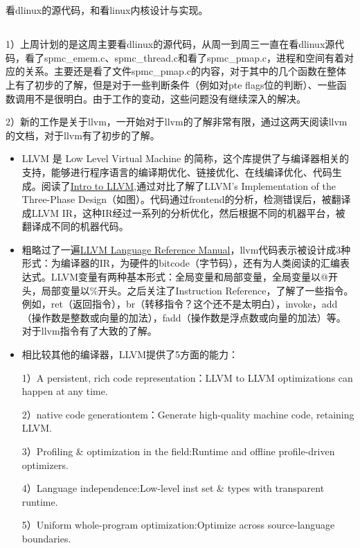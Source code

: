 \section{}

\subsection{}


看dlinux的源代码，和看linux内核设计与实现。

\subsection{}


1）上周计划的是这周主要看dlinux的源代码，从周一到周三一直在看dlinux源代码，看了spmc\_emem.c、spmc\_thread.c和看了spmc\_pmap.c，进程和空间有着对应的关系。主要还是看了文件spmc\_pmap.c的内容，对于其中的几个函数在整体上有了初步的了解，但是对于一些判断条件（例如对pte flags位的判断）、一些函数调用不是很明白。由于工作的变动，这些问题没有继续深入的解决。


2）新的工作是关于llvm，一开始对于llvm的了解非常有限，通过这两天阅读llvm的文档，对于llvm有了初步的了解。

\begin{itemize}

\item{LLVM 是 Low Level Virtual Machine 的简称，这个库提供了与编译器相关的支持，能够进行程序语言的编译期优化、链接优化、在线编译优化、代码生成。阅读了\href{http://www.aosabook.org/en/llvm.html}{Intro to LLVM},通过对比了解了LLVM's Implementation of the Three-Phase Design（如图）。代码通过frontend的分析，检测错误后，被翻译成LLVM IR，这种IR经过一系列的分析优化，然后根据不同的机器平台，被翻译成不同的机器代码。}

\item{粗略过了一遍\href{http://llvm.org/docs/LangRef.html}{LLVM Language Reference Manual}，llvm代码表示被设计成3种形式：为编译器的IR，为硬件的bitcode（字节码），还有为人类阅读的汇编表达式。LLVM变量有两种基本形式：全局变量和局部变量，全局变量以@开头，局部变量以\%开头。之后关注了Instruction Reference，了解了一些指令。例如，ret（返回指令），br（转移指令？这个还不是太明白），invoke，add（操作数是整数或向量的加法），fadd（操作数是浮点数或向量的加法）等。对于llvm指令有了大致的了解。}
\item{相比较其他的编译器，LLVM提供了5方面的能力：

1）A persistent, rich code representation：LLVM to LLVM optimizations can happen at any time.

2）native code generationtem：Generate high-quality machine code, retaining LLVM.

3）Profiling \& optimization in the field:Runtime and offline profile-driven optimizers.

4）Language independence:Low-level inst set \& types with transparent runtime.

5）Uniform whole-program optimization:Optimize across source-language boundaries.
      
}

\end{itemize}

